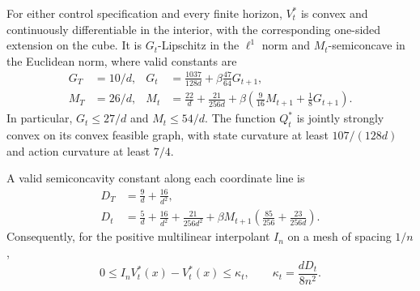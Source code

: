 \begin{theorem}\label{thm:regularity62}
For either control specification and every finite horizon, $V_t^*$ is convex and continuously differentiable in the interior, with the corresponding one-sided extension on the cube. It is $G_t$-Lipschitz in the $\ell^1$ norm and $M_t$-semiconcave in the Euclidean norm, where valid constants are
\begin{align*}
 G_T&=10/d,&G_t&=\frac{1037}{128d}+\beta\frac{47}{64}G_{t+1},\\
 M_T&=26/d,&M_t&=\frac{22}{d}+\frac{21}{256d}
             +\beta\left(\frac9{16}M_{t+1}+\frac18G_{t+1}\right).
\end{align*}
In particular, $G_t\le27/d$ and $M_t\le54/d$. The function $Q_t^*$ is jointly strongly convex on its convex feasible graph, with state curvature at least $107/(128d)$ and action curvature at least $7/4$.

A valid semiconcavity constant along each coordinate line is
\begin{align*}
 D_T&=\frac9d+\frac{16}{d^2},\\
 D_t&=\frac5d+\frac{16}{d^2}+\frac{21}{256d^2}
 +\beta M_{t+1}\left(\frac{85}{256}+\frac{23}{256d}\right).
\end{align*}
Consequently, for the positive multilinear interpolant $I_n$ on a mesh of spacing $1/n$,
\begin{equation}\label{eq:interpolation62}
 0\le I_nV_t^*(x)-V_t^*(x)\le\kappa_t,
 \qquad \kappa_t=\frac{dD_t}{8n^2}.
\end{equation}
\end{theorem}


